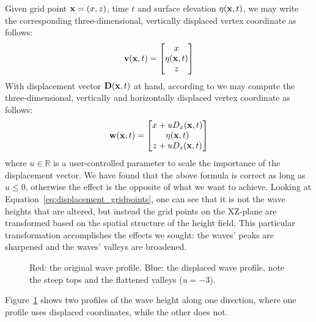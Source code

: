Given grid point $\mathbf{x} = (x,z)$, time $t$ and surface elevation $\eta(\mathbf{x},t)$, 
we may write the corresponding three-dimensional, vertically displaced vertex 
coordinate as follows:
\begin{equation}
 \mathbf{v}(\mathbf{x},t) = \begin{bmatrix}x\\ \eta(\mathbf{x},t)\\ z\end{bmatrix} 
\end{equation}
With displacement vector $\mathbf{D}(\mathbf{x},t)$ at hand, according to 
\citet{course:simulatingocean} we may compute the three-dimensional,
vertically and horizontally displaced vertex coordinate as follows:
\begin{equation}
\label{eq:displacement_gridpoints}
 \mathbf{w}(\mathbf{x},t) =
 \begin{bmatrix}
  x + u D_x(\mathbf{x},t)\\ 
  \eta(\mathbf{x},t)\\
  z + u D_z(\mathbf{x},t)
 \end{bmatrix}
\end{equation}
where $u\in\mathbb{R}$ is a user-controlled parameter to scale the importance of the
displacement vector. We have found that the above formula is correct as long as
$u \leq 0$, otherwise the effect is the opposite of what we want to achieve.
Looking at Equation~\ref{eq:displacement_gridpoints},
one can see that it is not the wave heights that are altered, but instead the grid
points on the XZ-plane are transformed based on the spatial structure of the
height field. This particular transformation accomplishes the effects we sought:
the waves' peaks are sharpened and the waves' valleys are broadened.
%
\begin{figure}
\centering
{}
\caption[An example wave profile and its displaced variant.]{
Red: the original wave profile. Blue: the displaced wave profile, note 
the steep tops and the flattened valleys ($u = -3$).}
\label{fig:grid_displaced}
\end{figure}
%
Figure~\ref{fig:grid_displaced} shows two profiles of the wave height along one 
direction, where one profile uses displaced coordinates, while the other does 
not.
%
